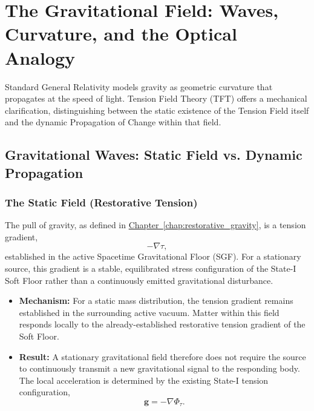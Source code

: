 \chapter{The Gravitational Field: Waves, Curvature, and the Optical Analogy}
\label{chap:gravitational_field}

Standard General Relativity models gravity as geometric curvature that propagates at the speed of light. Tension Field Theory (TFT) offers a mechanical clarification, distinguishing between the static existence of the Tension Field itself and the dynamic Propagation of Change within that field.

\section{Gravitational Waves: Static Field vs. Dynamic Propagation}
\label{sec:gravitational_waves_static_vs_dynamic}

\subsection{The Static Field (Restorative Tension)}
\label{subsec:static_field}

The pull of gravity, as defined in \hyperref[chap:restorative_gravity]{Chapter~\ref*{chap:restorative_gravity}}, is a tension gradient,
\begin{equation}
    -\nabla\tau,
\end{equation}
established in the active Spacetime Gravitational Floor (SGF). For a stationary source, this gradient is a stable, equilibrated stress configuration of the State-I Soft Floor rather than a continuously emitted gravitational disturbance.

\begin{itemize}
    \item \textbf{Mechanism:} For a static mass distribution, the tension gradient remains established in the surrounding active vacuum. Matter within this field responds locally to the already-established restorative tension gradient of the Soft Floor.
    
    \item \textbf{Result:} A stationary gravitational field therefore does not require the source to continuously transmit a new gravitational signal to the responding body. The local acceleration is determined by the existing State-I tension configuration,
    \begin{equation}
        \mathbf{g} = -\nabla\Phi_{\tau}.
    \end{equation}
\end{itemize}

